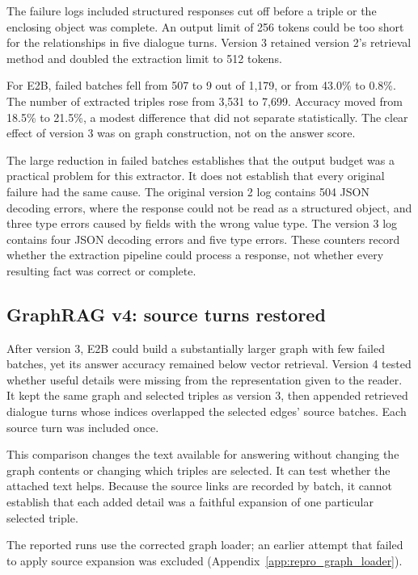The failure logs included structured responses cut off before a triple or the enclosing object
was complete. An output limit of 256 tokens could be too short for the relationships in five
dialogue turns. Version 3 retained version 2's retrieval method and doubled the extraction
limit to 512 tokens.

For E2B, failed batches fell from 507 to 9 out of 1,179, or from 43.0\% to 0.8\%. The number
of extracted triples rose from 3,531 to 7,699. Accuracy moved from 18.5\% to 21.5\%, a modest
difference that did not separate statistically. The clear
effect of version 3 was on graph construction, not on the answer score.

The large reduction in failed batches establishes that the output budget was a practical
problem for this extractor. It does not establish that every original failure had the same
cause. The original version 2 log contains 504 JSON decoding errors, where the response could not
be read as a structured object, and three type errors caused by fields with the wrong value type.
The version 3 log contains four JSON decoding errors and five type errors. These counters
record whether the extraction pipeline could process a response, not whether every resulting
fact was correct or complete.

\subsection{GraphRAG v4: source turns restored}

After version 3, E2B could build a substantially larger graph with few failed batches, yet its
answer accuracy remained below vector retrieval. Version 4 tested whether useful details were
missing from the representation given to the reader. It kept the same graph and selected
triples as version 3, then appended retrieved dialogue turns whose indices overlapped the
selected edges' source batches. Each source turn was included once.

This comparison changes the text available for answering without changing the graph contents or
changing which triples are selected. It can test whether the attached text helps. Because the
source links are recorded by batch, it cannot establish that each added detail was a faithful
expansion of one particular selected triple.

The reported runs use the corrected graph loader; an earlier attempt that failed to apply
source expansion was excluded (Appendix~\ref{app:repro_graph_loader}).

